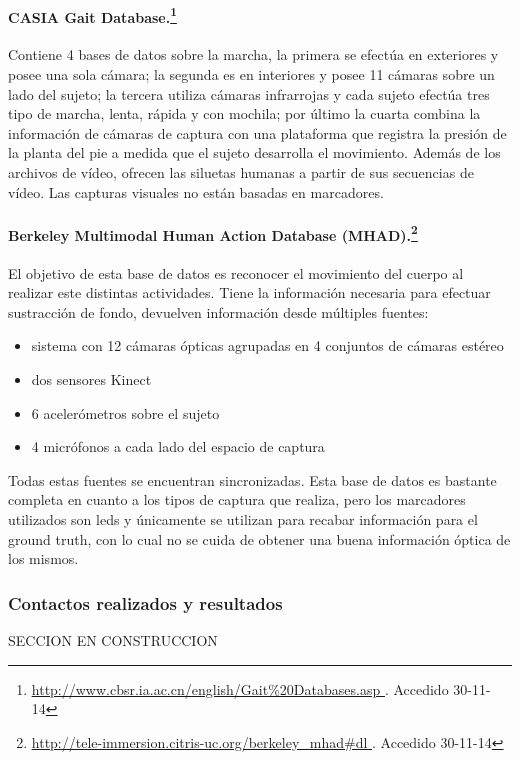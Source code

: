 \paragraph{CASIA Gait Database.\footnote{ \textcolor{blue}{\underline{\url{http://www.cbsr.ia.ac.cn/english/Gait\%20Databases.asp
 }}}. Accedido 30-11-14}} 
Contiene 4 bases de datos sobre la marcha, la primera se efectúa en exteriores y posee una sola cámara; la segunda es en interiores  y posee 11 cámaras sobre un lado del sujeto; la tercera utiliza cámaras infrarrojas y cada sujeto efectúa tres tipo de marcha, lenta, rápida y con mochila; por último la cuarta combina la información de cámaras de captura con una plataforma que registra la presión de la planta del pie a medida que el sujeto desarrolla el movimiento. Además de los archivos de vídeo, ofrecen las siluetas humanas a partir de sus secuencias de vídeo. Las capturas visuales no están basadas en marcadores.

\paragraph{Berkeley Multimodal Human Action Database (MHAD).\footnote{\textcolor{blue}{\underline{\url{http://tele-immersion.citris-uc.org/berkeley_mhad\#dl  }}}. Accedido 30-11-14}}
El objetivo de esta base de datos es reconocer el movimiento del cuerpo al realizar este distintas actividades. Tiene la información necesaria para efectuar sustracción de fondo, devuelven información desde múltiples fuentes:
\begin{itemize}
\item sistema con 12 cámaras ópticas agrupadas en 4 conjuntos de cámaras estéreo
\item dos sensores Kinect
\item 6 acelerómetros sobre el sujeto
\item 4 micrófonos a cada lado del espacio de captura
\end{itemize} Todas estas fuentes se encuentran sincronizadas. Esta base de datos es bastante completa en cuanto a los tipos de captura que realiza, pero los marcadores utilizados son leds y únicamente se utilizan para recabar información para el ground truth, con lo cual no se cuida de obtener una buena información óptica de los mismos. 



\subsubsection{Contactos realizados y resultados} SECCION EN CONSTRUCCION\\

